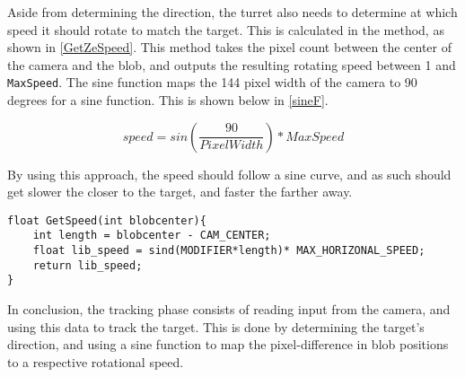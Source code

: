 Aside from determining the direction, the turret also needs to determine at
which speed it should rotate to match the target. This is calculated in the
 method, as shown in \autoref{GetZeSpeed}. This method
takes the pixel count between the center of the camera and the blob, and outputs
the resulting rotating speed between 1 and \texttt{MaxSpeed}. The sine function
maps the 144 pixel width of the camera to 90 degrees for a sine function. This is shown below in
\autoref{sineF}.

\begin{equation}\label{sineF}
speed = sin(\frac{90}{PixelWidth})*MaxSpeed
\end{equation} 

By using this approach, the speed should follow a sine curve, and as such
should get slower the closer to the target, and faster the farther away.\nl

\begin{minipage}[H]{\linewidth}
\begin{lstlisting}[caption = Determine speed to rotate using a sine function, label = GetZeSpeed] 
float GetSpeed(int blobcenter){
    int length = blobcenter - CAM_CENTER;
    float lib_speed = sind(MODIFIER*length)* MAX_HORIZONAL_SPEED;
    return lib_speed;
}
\end{lstlisting}
\end{minipage}

In conclusion, the tracking phase consists of reading input from the camera, and
using this data to track the target. This is done by determining the target's
direction, and using a sine function to map the pixel-difference in blob
positions to a respective rotational speed.